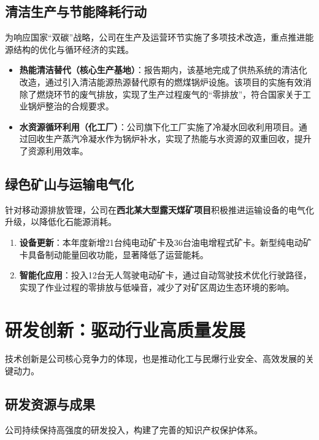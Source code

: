 \documentclass[a4paper,12pt]{article}
\begin{document}
\subsection{清洁生产与节能降耗行动}

为响应国家“双碳”战略，公司在生产及运营环节实施了多项技术改造，重点推进能源结构的优化与循环经济的实践。

\begin{itemize}
    \item \textbf{热能清洁替代（核心生产基地）}：报告期内，该基地完成了供热系统的清洁化改造，通过引入清洁能源热源替代原有的燃煤锅炉设施。该项目的实施有效消除了燃烧环节的废气排放，实现了生产过程废气的“零排放”，符合国家关于工业锅炉整治的合规要求。
    \item \textbf{水资源循环利用（化工厂）}：公司旗下化工厂实施了冷凝水回收利用项目。通过回收生产蒸汽冷凝水作为锅炉补水，实现了热能与水资源的双重回收，提升了资源利用效率。
\end{itemize}

\subsection{绿色矿山与运输电气化}

针对移动源排放管理，公司在\textbf{西北某大型露天煤矿项目}积极推进运输设备的电气化升级，以降低化石能源消耗。

\begin{enumerate}
    \item \textbf{设备更新}：本年度新增21台纯电动矿卡及36台油电增程式矿卡。新型纯电动矿卡具备制动能量回收功能，显著降低了运营能耗。
    \item \textbf{智能化应用}：投入12台无人驾驶电动矿卡，通过自动驾驶技术优化行驶路径，实现了作业过程的零排放与低噪音，减少了对矿区周边生态环境的影响。
\end{enumerate}

\section{研发创新：驱动行业高质量发展}

技术创新是公司核心竞争力的体现，也是推动化工与民爆行业安全、高效发展的关键动力。

\subsection{研发资源与成果}

公司持续保持高强度的研发投入，构建了完善的知识产权保护体系。
\end{document}
